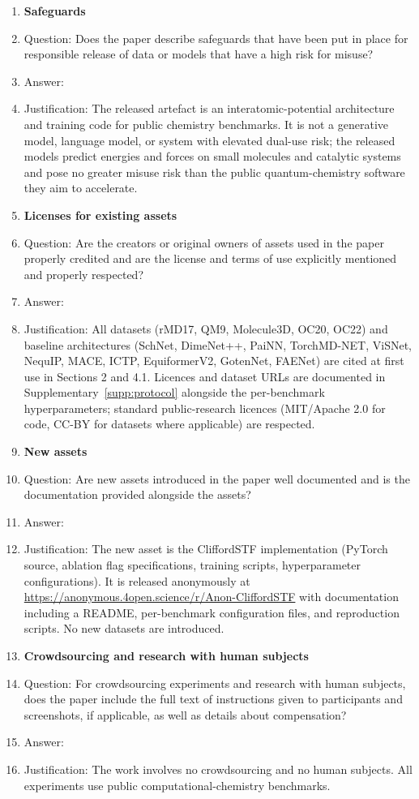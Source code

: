 \begin{enumerate}
\item {\bf Safeguards}
    \item[] Question: Does the paper describe safeguards that have been put in place for responsible release of data or models that have a high risk for misuse?
    \item[] Answer: \answerNA{}
    \item[] Justification: The released artefact is an interatomic-potential architecture and training code for public chemistry benchmarks. It is not a generative model, language model, or system with elevated dual-use risk; the released models predict energies and forces on small molecules and catalytic systems and pose no greater misuse risk than the public quantum-chemistry software they aim to accelerate.

\item {\bf Licenses for existing assets}
    \item[] Question: Are the creators or original owners of assets used in the paper properly credited and are the license and terms of use explicitly mentioned and properly respected?
    \item[] Answer: \answerYes{}
    \item[] Justification: All datasets (rMD17, QM9, Molecule3D, OC20, OC22) and baseline architectures (SchNet, DimeNet++, PaiNN, TorchMD-NET, ViSNet, NequIP, MACE, ICTP, EquiformerV2, GotenNet, FAENet) are cited at first use in Sections 2 and 4.1. Licences and dataset URLs are documented in Supplementary~\ref{supp:protocol} alongside the per-benchmark hyperparameters; standard public-research licences (MIT/Apache 2.0 for code, CC-BY for datasets where applicable) are respected.

\item {\bf New assets}
    \item[] Question: Are new assets introduced in the paper well documented and is the documentation provided alongside the assets?
    \item[] Answer: \answerYes{}
    \item[] Justification: The new asset is the CliffordSTF implementation (PyTorch source, ablation flag specifications, training scripts, hyperparameter configurations). It is released anonymously at \url{https://anonymous.4open.science/r/Anon-CliffordSTF} with documentation including a README, per-benchmark configuration files, and reproduction scripts. No new datasets are introduced.

\item {\bf Crowdsourcing and research with human subjects}
    \item[] Question: For crowdsourcing experiments and research with human subjects, does the paper include the full text of instructions given to participants and screenshots, if applicable, as well as details about compensation?
    \item[] Answer: \answerNA{}
    \item[] Justification: The work involves no crowdsourcing and no human subjects. All experiments use public computational-chemistry benchmarks.


\end{enumerate}
